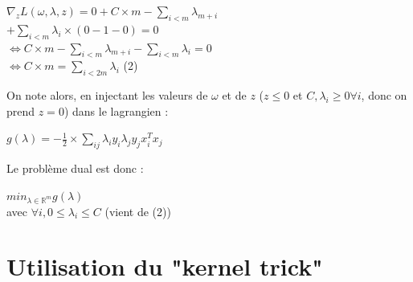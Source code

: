 \documentclass{article}
\begin{document}
              \begin{center}
              $\nabla_{z} L(\omega, \lambda, z) = 0 + C \times m - \sum_{i < m} \lambda_{m+i} $\\
              $+ \sum_{i < m} \lambda_i \times (0 - 1 - 0) = 0$\\
              $\Leftrightarrow C \times m - \sum_{i < m} \lambda_{m+i} - \sum_{i < m} \lambda_i = 0$\\
              $\Leftrightarrow  C \times m = \sum_{i < 2m} \lambda_i$ (2)\\
              \end{center}

On note alors, en injectant les valeurs de $\omega$ et de $z$ ($z \leq 0$ et $C, \lambda_i \geq 0 \forall i$, donc on prend $z=0$) dans le lagrangien :\\

              \begin{center}
              $g(\lambda) = -\frac{1}{2} \times \sum_{ij} \lambda_i y_i \lambda_j y_j x_i^{T} x_j$
              \end{center}

Le problème dual est donc :\\

             \begin{center}
             $min_{\lambda \in \mathbb{R}^{m}} g(\lambda)$\\ 
             avec $\forall i, 0 \leq \lambda_i \leq C$ (vient de (2))\\
             \end{center}

\section{Utilisation du "kernel trick"}
\end{document}
